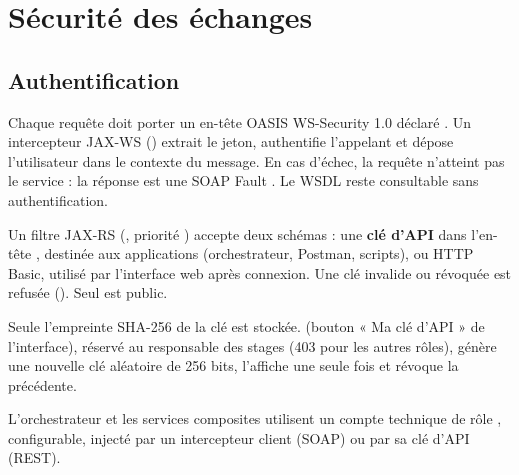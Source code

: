 \chapter{Sécurité des échanges}\label{chap:securite}

\section{Authentification}
\begin{description}[style=nextline]
  \item[Services SOAP — WS-Security] Chaque requête doit porter un en-tête OASIS WS-Security 1.0
         déclaré . Un intercepteur JAX-WS
        () extrait le jeton, authentifie l'appelant et dépose l'utilisateur dans le contexte du
        message. En cas d'échec, la requête n'atteint pas le service : la réponse est une SOAP Fault
        . Le WSDL reste consultable sans authentification.
  \item[Services REST — clé d'API ou HTTP Basic] Un filtre JAX-RS (, priorité
        ) accepte deux schémas : une \textbf{clé d'API} dans l'en-tête , destinée aux
        applications (orchestrateur, Postman, scripts), ou HTTP Basic, utilisé par l'interface web après connexion.
        Une clé invalide ou révoquée est refusée (). Seul  est public.
  \item[Gestion des clés] Seule l'empreinte SHA-256 de la clé est stockée.  (bouton
        « Ma clé d'API » de l'interface), réservé au responsable des stages (403 pour les autres rôles), génère une
        nouvelle clé aléatoire de 256 bits, l'affiche une seule fois et révoque la précédente.
  \item[Appels inter-services] L'orchestrateur et les services composites utilisent un compte technique de rôle
        , configurable, injecté par un intercepteur client (SOAP) ou par sa clé d'API (REST).
\end{description}

